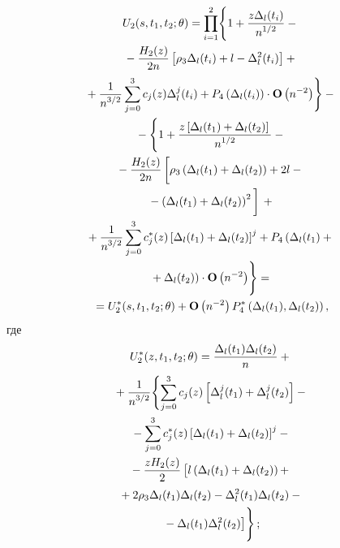 \begin{multicols}{2}
  \pagebreak
  
\noindent
   \begin{multline*} 
U_2(s,t_1,t_2;\theta)=\prod_{i=1}^2 \Biggl\{
     1+\fr{z \Delta_l(t_i)}{n^{1/2}}-{}\\
     {}-\fr{H_2(z)}{2n}
    \left[ \rho_3
    \Delta_l(t_i)+l-\Delta_l^2(t_i)\right]+
{}\\
   {}  +\fr{1}{n^{3/2}} \sum_{j=0}^3 c_j(z) \Delta_l^j(t_i)+
      P_4\left(\Delta_l(t_i)\right)\cdot {\bf O}\left(n^{-2}\right)
    \Biggr\}-{}\\
    {}-
     \Biggl\{ 1+
    \fr{z\left[\Delta_l(t_1)+\Delta_l(t_2) \right]}{n^{1/2}}-
{}\\
    {} -\fr{H_2(z)}{2n}
       \left[ \vphantom{\fr{H_2(z)}{2n}}
        \rho_3 \left(
       \Delta_l(t_1)+\Delta_l(t_2) \right)+2l-{}\right.\\
\left.       {}-
       \left(\Delta_l(t_1)+\Delta_l(t_2) \right)^2 
       \vphantom{\fr{H_2(z)}{2n}}
       \right] \vphantom{\fr{H_2(z)}{2n}}+
    {}\\
    {} +\fr{1}{n^{3/2}} \sum_{j=0}^3 c_j^*(z)
       \left[\Delta_l(t_1)+\Delta_l(t_2) \right]^j+
       P_4\left(\Delta_l(t_1)+ {}\right.\\
\left.       {}+
\Delta_l(t_2)\right)\cdot
       {\bf O}\left(n^{-2}\right) \Biggr\}=
    {}\\
{} =U_2^*(s,t_1,t_2;\theta)+{\bf O}\left(n^{-2}\right)
       P_4^* \left(\Delta_l(t_1),\Delta_l(t_2)\right),
    \end{multline*}
    где
\begin{multline*}  
U_2^*(z,t_1,t_2;\theta)=\displaystyle\frac{\displaystyle \Delta_l(t_1)\Delta_l(t_2)\mathstrut}{\displaystyle n\mathstrut} +{}\\
{}+
        \displaystyle\frac{\displaystyle 1\mathstrut}{\displaystyle n^{3/2}\mathstrut} \Biggl\{
        \sum_{j=0}^3 c_j(z)
        \left[\Delta_l^j(t_1)+\Delta_l^j(t_2)\right]-
{}\\
{}  -\sum_{j=0}^3 c_j^*(z)
        \left[
        \Delta_l(t_1)+\Delta_l(t_2)\right]^j-{}\\
        {}- \displaystyle\frac{\displaystyle zH_2(z)\mathstrut}{\displaystyle 2\mathstrut}
         \left[\vphantom{\Delta^2_l}
          l\left(\Delta_l(t_1)+\Delta_l(t_2) \right)+\right.{}\\
{}        + 2\rho_3\Delta_l(t_1)\Delta_l(t_2)-\Delta_l^2(t_1)\Delta_l(t_2)-{}\\
\left. {}-
        \Delta_l(t_1)\Delta_l^2(t_2)\right] \Biggr\}\,;
   \end{multline*}
   
   \vspace*{-12pt}
   

\end{multicols}
